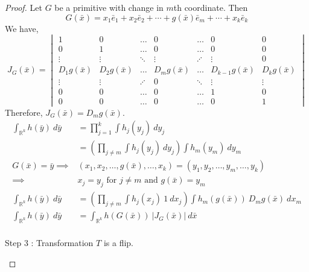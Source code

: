 \begin{proof}
	Let $G$ be a primitive with change in $m$th coordinate.
	Then
	\begin{equation}
		G(\bar{x}) = x_1\bar{e}_1 + x_2\bar{e}_2 + \dotsm + g(\bar{x})\bar{e}_m + \dotsm + x_k\bar{e}_k
	\end{equation}
	We have,
	\begin{equation}
		J_G(\bar{x}) = \begin{vmatrix}
			1 & 0 & \dots & 0 & \dots & 0 & 0 \\
			0 & 1 & \dots & 0 & \dots & 0 & 0 \\
			\vdots & \vdots & \ddots & \vdots & \iddots & \vdots & 0 \\ 
			D_1g(\bar{x}) & D_2g(\bar{x}) & \dots & D_mg(\bar{x}) & \dots & D_{k-1}g(\bar{x}) & D_kg(\bar{x}) \\
			\vdots & \vdots & \iddots & 0 & \ddots & \vdots & \vdots \\
			0 & 0 & \dots & 0 & \dots & 1 & 0 \\
			0 & 0 & \dots & 0 & \dots & 0 & 1 
		\end{vmatrix}
	\end{equation}
	Therefore, $J_G(\bar{x}) = D_mg(\bar{x})$.
	\begin{align*}
		\int_{\mathbb{R}^k} h(\bar{y})\ d\bar{y} & = \prod_{j = 1}^k \int h_j(y_j)\ dy_j\\
		& = \left( \prod_{j \ne m} \int h_j(y_j)\ dy_j \right) \int h_m(y_m)\ dy_m \\
		G(\bar{x}) = \bar{y} \implies & (x_1,x_2,\dots,g(\bar{x}),\dots,x_k) = (y_1,y_2,\dots,y_m,\dots,y_k)\\
		\implies & x_j = y_j \text{ for } j \ne m \text{ and } g(\bar{x}) = y_m\\
		\int_{\mathbb{R}^k} h(\bar{y})\ d\bar{y} & = \left( \prod_{j \ne m} \int h_j(x_j)\ 1\ dx_j \right) \int h_m(g(\bar{x}))\ D_mg(\bar{x})\ dx_m \\
		\int_{\mathbb{R}^k} h(\bar{y})\ d\bar{y} & = \int_{\mathbb{R}^k} h(G(\bar{x}))\ |J_G(\bar{x})|\ d\bar{x}\\
	\end{align*}
	\begin{commentary}
		Step 3 : Transformation $T$ is a flip.
	\end{commentary}


\end{proof}
